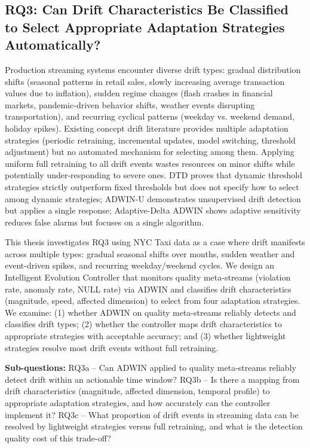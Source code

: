 \subsection{RQ3: Can Drift Characteristics Be Classified to Select Appropriate Adaptation Strategies Automatically?}

Production streaming systems encounter diverse drift types: gradual distribution shifts (seasonal patterns in retail sales, slowly increasing average transaction values due to inflation), sudden regime changes (flash crashes in financial markets, pandemic-driven behavior shifts, weather events disrupting transportation), and recurring cyclical patterns (weekday vs. weekend demand, holiday spikes). Existing concept drift literature provides multiple adaptation strategies (periodic retraining, incremental updates, model switching, threshold adjustment) but no automated mechanism for selecting among them. Applying uniform full retraining to all drift events wastes resources on minor shifts while potentially under-responding to severe ones. DTD proves that dynamic threshold strategies strictly outperform fixed thresholds \citep{dtd2026} but does not specify how to select among dynamic strategies; ADWIN-U demonstrates unsupervised drift detection \citep{adwinu2025} but applies a single response; Adaptive-Delta ADWIN shows adaptive sensitivity reduces false alarms \citep{adt2025} but focuses on a single algorithm.

This thesis investigates RQ3 using NYC Taxi data as a case where drift manifests across multiple types: gradual seasonal shifts over months, sudden weather and event-driven spikes, and recurring weekday/weekend cycles. We design an Intelligent Evolution Controller that monitors quality meta-streams (violation rate, anomaly rate, NULL rate) via ADWIN and classifies drift characteristics (magnitude, speed, affected dimension) to select from four adaptation strategies. We examine: (1) whether ADWIN on quality meta-streams reliably detects and classifies drift types; (2) whether the controller maps drift characteristics to appropriate strategies with acceptable accuracy; and (3) whether lightweight strategies resolve most drift events without full retraining.

\textbf{Sub-questions:} RQ3a -- Can ADWIN applied to quality meta-streams reliably detect drift within an actionable time window? RQ3b -- Is there a mapping from drift characteristics (magnitude, affected dimension, temporal profile) to appropriate adaptation strategies, and how accurately can the controller implement it? RQ3c -- What proportion of drift events in streaming data can be resolved by lightweight strategies versus full retraining, and what is the detection quality cost of this trade-off?

